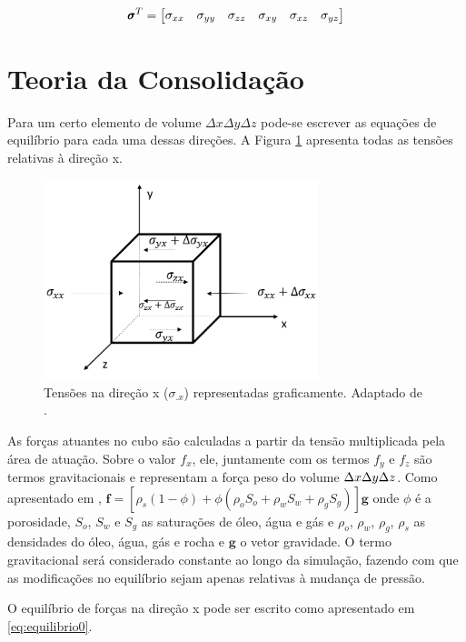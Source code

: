 \begin{equation}
\pmb{\sigma}^T = \begin{bmatrix}
\sigma_{xx} & \sigma_{yy} & \sigma_{zz} & \sigma_{xy} & \sigma_{xz} & \sigma_{yz}
\end{bmatrix}
\label{eq:tensor6}
\end{equation}


\section{Teoria da Consolidação}

Para um certo elemento de volume $\Delta x\Delta y \Delta z$ pode-se escrever as equações de equilíbrio para cada uma dessas direções. A Figura \ref{fig:equilibrio} apresenta todas as tensões relativas à direção x.

\begin{figure}[!htbp]
\centering
\includegraphics[width=8cm]{chap01/figs/equilibrio.png}
\caption{Tensões na direção x ($\sigma_{.x}$) representadas graficamente.  Adaptado de \cite{CompGeomec}.}
\label{fig:equilibrio}
\end{figure}


As forças atuantes no cubo são calculadas a partir da tensão multiplicada pela área de atuação. Sobre o valor $f_x$, ele, juntamente com os termos $f_y$ e $f_z$  são termos gravitacionais e representam a força peso do volume $\Delta x\Delta y\Delta z$. Como apresentado em \citet{xiuligai}, $\mathbf{f} = [\rho_s(1-\phi) + \phi(\rho_o S_o + \rho_w S_w + \rho_g S_g )] \mathbf{g}$ onde $\phi$ é a porosidade, $S_o$, $S_w$ e $S_g$ as saturações de óleo, água e gás e $\rho_o$, $\rho_w$, $\rho_g$, $\rho_s$  as densidades do óleo, água, gás e rocha e $\mathbf{g}$ o vetor gravidade. O termo gravitacional será considerado constante ao longo da simulação, fazendo com que as modificações no equilíbrio sejam apenas relativas à mudança de pressão. 

O equilíbrio de forças na direção x pode ser escrito como apresentado em \eqref{eq:equilibrio0}. 


